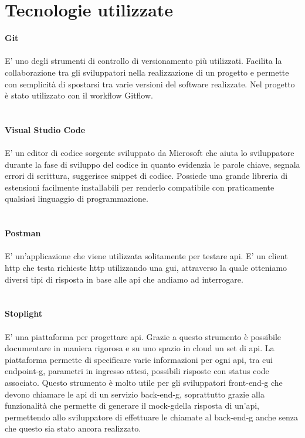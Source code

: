 \section{Tecnologie utilizzate}

\textbf{Git}
\\\\
E' uno degli strumenti di controllo di versionamento più utilizzati. Facilita la collaborazione
tra gli sviluppatori nella realizzazione di un progetto e permette con semplicità di spostarsi
tra varie versioni del software realizzate. Nel progetto è stato utilizzato con il workflow
Gitflow.
\\\\\\
\textbf{Visual Studio Code}
\\\\
E' un editor di codice sorgente sviluppato da Microsoft che aiuta lo sviluppatore durante la fase
di sviluppo del codice in quanto evidenzia le parole chiave, segnala errori di scrittura, suggerisce
snippet di codice. Possiede una grande libreria di estensioni facilmente installabili per renderlo
compatibile con praticamente qualsiasi linguaggio di programmazione.
\\\\\\
\textbf{Postman}
\\\\
E' un'applicazione che viene utilizzata solitamente per testare \gls{api}. E' un client \gls{http} che testa richieste
\gls{http} utilizzando una \gls{gui}\glsfirstoccur, attraverso la quale otteniamo diversi tipi di risposta in base alle \gls{api} che 
andiamo ad interrogare.
\\\\\\
\textbf{Stoplight}
\\\\
E' una piattaforma per progettare \gls{api}. Grazie a questo strumento è possibile documentare in maniera rigorosa
e su uno spazio in cloud un set di \gls{api}. La piattaforma permette di specificare varie informazioni per ogni
\gls{api}, tra cui \gls{endpoint-g}\glsfirstoccur, parametri in ingresso attesi, possibili risposte con status code associato. Questo
strumento è molto utile per gli sviluppatori \gls{front-end-g} che devono chiamare le \gls{api} di un servizio
\gls{back-end-g}, soprattutto grazie alla funzionalità che permette di generare il \gls{mock-g}\glsfirstoccur della risposta di un'\gls{api}, 
permettendo allo sviluppatore di effettuare le chiamate al \gls{back-end-g} anche senza che questo sia stato ancora realizzato.
